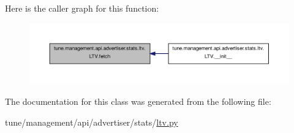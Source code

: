 Here is the caller graph for this function\-:
\nopagebreak
\begin{figure}[H]
\begin{center}
\leavevmode
\includegraphics[width=350pt]{classtune_1_1management_1_1api_1_1advertiser_1_1stats_1_1ltv_1_1LTV_a10f3a6a49f64a203162ae337ff5ccefd_icgraph}
\end{center}
\end{figure}




The documentation for this class was generated from the following file\-:\begin{DoxyCompactItemize}
\item 
tune/management/api/advertiser/stats/\hyperlink{ltv_8py}{ltv.\-py}\end{DoxyCompactItemize}
